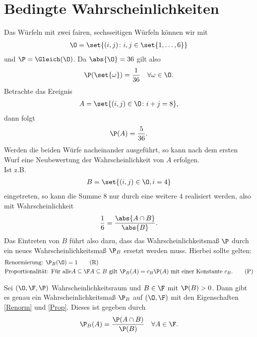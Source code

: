 \section{Bedingte Wahrscheinlichkeiten}
\begin{example}
	Das Würfeln mit zwei fairen, sechsseitigen Würfeln können wir mit 
	\begin{align}
		\O = \set{(i,j) \colon i,j \in \set{1,\dots,6}}\notag
	\end{align}
	und $\P = \Gleich(\O)$. Da $\abs{\O} = 36$ gilt also
	\begin{align}
		\P(\set{\omega}) = \frac{1}{36} \quad \forall \omega \in \O.\notag
	\end{align}
	Betrachte das Ereignis
	\begin{align}
		A = \set{(i,j) \in \O \colon i + j = 8},\notag
	\end{align}
	dann folgt
	\begin{align}
		\P(A) = \frac{5}{36}.\notag
	\end{align}
	Werden die beiden Würfe nacheinander ausgeführt, so kann nach dem ersten Wurf eine Neubewertung der Wahrscheinlichkeit von $A$ erfolgen.\\
	Ist z.B.
	\begin{align}
		B = \set{(i,j) \in \O, i = 4}\notag
	\end{align}
	eingetreten, so kann die Summe $8$ nur durch eine weitere $4$ realisiert werden, also mit Wahrscheinlichkeit
	\begin{align}
		\frac{1}{6} = \frac{\abs{A \cap B}}{\abs{B}}.\notag 
	\end{align}
	Das Eintreten von $B$ führt also dazu, dass das Wahrscheinlichkeitsmaß $\P$ durch ein neues Wahrscheinlichkeitsmaß $\P_{B}$ ersetzt werden muss. Hierbei sollte gelten:
	\begin{align}
		 &\text{Renormierung: }\P_{B}(\O) = 1\label{Renorm}\tag{R}\\
		 &\text{Proportionalität: Für alle} A \subseteq \F \mit A \subseteq B \text{ gilt }
		 \P_{B}(A) = c_B \P(A) \text{ mit einer Konstante } c_B.\label{Prop}\tag{P}
    \end{align}
\end{example}

\begin{lemma}
	Sei $(\O, \F, \P)$ Wahrscheinlichkeitsraum und $B \in \F$ mit $\P(B) > 0$. Dann gibt es genau ein Wahrscheinlichkeitsmaß $\P_B$ auf $(\O, \F)$ mit den Eigenschaften \eqref{Renorm} und \eqref{Prop}. Dieses ist gegeben durch
	\begin{align}
		\P_{B}(A) = \frac{\P(A\cap B)}{\P(B)} \quad \forall A \in \F.\notag
	\end{align}
\end{lemma}

